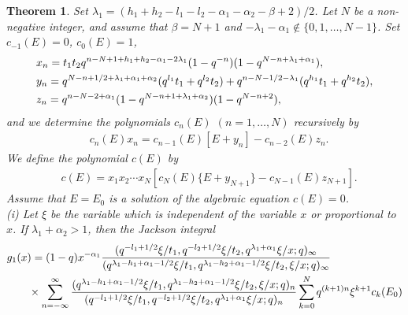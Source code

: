 \documentclass[12pt]{amsart}
\numberwithin{equation}{section}
\newtheorem{thm}{Theorem}[section]
\theoremstyle{definition}
\theoremstyle{remark}
\begin{document}
\begin{thm} \label{thm:2sols}
Set $\lambda_{1} = (h_{1} + h_{2} - l_{1} - l_{2} - \alpha_{1} - \alpha_{2} - \beta + 2)/2$.
Let $N$ be a non-negative integer, and assume that $\beta = N +1 $ and $-\lambda_{1} -\alpha _1 \not \in \{ 0,1,\dots ,N-1 \}$.
Set $c_{-1}(E)=0 $,  $c_0(E)=1 $,
\begin{align}
 & x_n =t_{1}t_{2} q^{ n - N +1 + h_{1} + h_{2} - \alpha _1 - 2 \lambda _1 } (1 - q^{-n})(1 - q^{N-n + \lambda _1 + \alpha _1 }) , \label{eq:2xyz}  \\
 & y_n =  q^{N -n + 1/2 + \lambda _1 + \alpha_{1} + \alpha_{2} } (q^{l_{1}}t_{1} + q^{l_{2}}t_{2}) + q^{n- N-1/2  - \lambda _1} (q^{h_{1}}t_{1} + q^{h_{2}}t_{2})  , \notag \\
 & z_n = q^{ n - N-2 + \alpha_{1}  } (1 - q^{N -n +1 +\lambda _1 + \alpha_{2}  })(1 - q^{N- n + 2}), \notag
\end{align}
and we determine the polynomials $c_n(E)$ $(n=1,\dots ,N)$ recursively by
\begin{align}
 & c_{n} (E) x_n = c_{n - 1} (E) [E + y_n ] -c_{n-2} (E) z_n . \label{eq:2cnE}
\end{align}
We define the polynomial $c (E)$ by
\begin{align}
 & c (E) = x_1 x_2 \cdots x_{N} [ c_{N} (E) \{ E + y_{N+1} \} -c_{N-1} (E) z_{N+1} ] . \label{eq:2cE}
\end{align}
Assume that $E=E_0$ is a solution of the algebraic equation $c (E)=0$.
\\
(i) Let $\xi $ be the variable which is independent of the variable $x$ or proportional to $x$.
If  $ \lambda _{1} + \alpha _{2}  > 1$, then the Jackson integral
  \begin{align*}
    &g _1 (x) = (1 - q) x^{-\alpha_{1}} \frac{(q^{-l_{1} + 1/2}\xi/t_{1}, q^{-l_{2} + 1/2}\xi/t_{2}, q^{ \lambda _{1} + \alpha _{1} }\xi/x; q)_{\infty}}{(q^{ \lambda _{1} -h_{1} + \alpha _{1} - 1/2}\xi/t_{1}, q^{ \lambda _{1} -h_{2}+ \alpha _{1} - 1/2}\xi/t_{2}, \xi/x; q)_{\infty}} \\
    &\qquad \times \sum_{n = -\infty}^{\infty} \frac{(q^{ \lambda _{1} -h_{1} + \alpha _{1} - 1/2}\xi/t_{1}, q^{ \lambda _{1} -h_{2} + \alpha _{1} - 1/2}\xi/t_{2}, \xi/x; q)_{n}}{(q^{-l_{1} + 1/2}\xi/t_{1}, q^{-l_{2} + 1/2}\xi/t_{2}, q^{ \lambda _{1} + \alpha _{1} }\xi/x; q)_{n}} \sum_{k = 0}^{N} q^{( k+1)n} \xi^{k+1} c_{k}(E_0) \notag
  \end{align*}

\end{thm}
\end{document}
